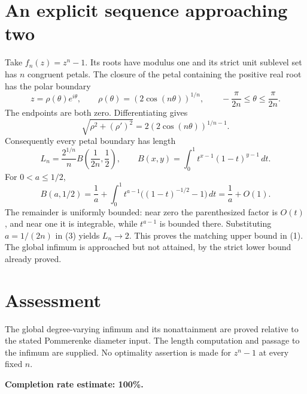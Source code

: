 \documentclass[11pt]{article}
\begin{document}
\section*{An explicit sequence approaching two}
Take $f_n(z)=z^n-1$. Its roots have modulus one and its strict unit sublevel set has $n$ congruent petals. The closure of the petal containing the positive real root has the polar boundary
\[
 z=\rho(\theta)e^{i\theta},\qquad
 \rho(\theta)=(2\cos(n\theta))^{1/n},\qquad
 -\frac\pi{2n}\le\theta\le\frac\pi{2n}.
\]
The endpoints are both zero. Differentiating gives
\[
 \sqrt{\rho^2+(\rho')^2}
 =2(2\cos(n\theta))^{1/n-1}.
\]
Consequently every petal boundary has length
\[
 L_n=\frac{2^{1/n}}n B\left(\frac1{2n},\frac12\right),\qquad
 B(x,y)=\int_0^1 t^{x-1}(1-t)^{y-1}\,dt.
\tag{3}
\]
For $0<a\le1/2$,
\[
 B(a,1/2)=\frac1a+
 \int_0^1t^{a-1}\bigl((1-t)^{-1/2}-1\bigr)\,dt
 =\frac1a+O(1).
\]
The remainder is uniformly bounded: near zero the parenthesized factor is $O(t)$, and near one it is integrable, while $t^{a-1}$ is bounded there. Substituting $a=1/(2n)$ in (3) yields $L_n\to2$. This proves the matching upper bound in (1). The global infimum is approached but not attained, by the strict lower bound already proved.

\section*{Assessment}
The global degree-varying infimum and its nonattainment are proved relative to the stated Pommerenke diameter input. The length computation and passage to the infimum are supplied. No optimality assertion is made for $z^n-1$ at every fixed $n$.

\textbf{Completion rate estimate: 100\%.}
\end{document}
